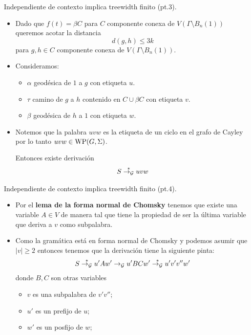 \documentclass[aspectratio=169, 11pt]{beamer}
\begin{document}
	\begin{frame}[fragile]{Independiente de contexto implica treewidth finito (pt.3).}

		\begin{itemize}
			\item
				Dado que $f(t) = \beta C$ para $C$ componente conexa de $V(\Gamma \setminus B_{n}(1))$ queremos acotar la distancia 
				\[
					d(g,h) \le 3k	
				\]
				para $g,h \in C$ componente conexa de $V(\Gamma \setminus B_{n}(1))$.

			\item 
				Consideramos: 
				\begin{itemize}
					\item $\alpha$ geodésica de $1$ a $g$ con etiqueta $u$.
					\item $\tau$ camino de $g$ a $h$ contenido en $C \cup \beta C$ con etiqueta $v$.
					\item $\beta$ geodésica de $h$ a $1$ con etiqueta $w$.
				\end{itemize}
			\item 
				Notemos que la palabra 	$uvw$ es la etiqueta de un ciclo en el grafo de Cayley por lo tanto $uvw \in \text{WP}(G, \Sigma)$.
				
				Entonces existe derivación
				\[
					S \overset{*}{\to_{\cal G}} uvw	
				\]
		\end{itemize}
	\end{frame}

	\begin{frame}[fragile]{Independiente de contexto implica treewidth finito (pt.4).}
		\begin{itemize}
			\item 
				Por el \textbf{lema de la forma normal de Chomsky} tenemos que existe una variable $A \in V$ de manera tal que tiene la propiedad de ser la última variable que deriva a $v$ como subpalabra.

			\item 
				Como la gramática está en forma normal de Chomsky y podemos asumir que $|v| \ge 2$ entonces tenemos que la derivación tiene la siguiente pinta:
				\begin{equation*}
					S \overset{*}{\to_{\cal G}} u'Aw' \to_{\cal G} u'BC w' \overset{*}{\to_{\cal G}} u'v'v''w'
				\end{equation*}
				donde $B,C$ son otras variables 
				\begin{itemize}
					\item $v$ es una subpalabra de $v'v''$;
					\item $u'$ es un prefijo de $u$;
					\item $w'$ es un posfijo de $w$;
				\end{itemize}
		\end{itemize}
	\end{frame}
\end{document}
